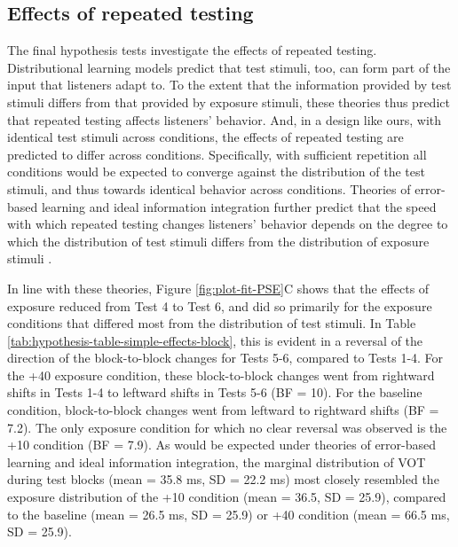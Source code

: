 \documentclass[
  11pt,
  man,mask,floatsintext]{apa6}
\begin{document}
\subsection{Effects of repeated testing}\label{effects-of-repeated-testing}

The final hypothesis tests investigate the effects of repeated testing. Distributional learning models predict that test stimuli, too, can form part of the input that listeners adapt to. To the extent that the information provided by test stimuli differs from that provided by exposure stimuli, these theories thus predict that repeated testing affects listeners' behavior. And, in a design like ours, with identical test stimuli across conditions, the effects of repeated testing are predicted to differ across conditions. Specifically, with sufficient repetition all conditions would be expected to converge against the distribution of the test stimuli, and thus towards identical behavior across conditions. Theories of error-based learning and ideal information integration further predict that the speed with which repeated testing changes listeners' behavior depends on the degree to which the distribution of test stimuli differs from the distribution of exposure stimuli \autocites{davis-sohoglu2020,kleinschmidt-jaeger2015}[for relevant discussion, see also][]{lancia-winter2013,xie-kurumada2024}.

In line with these theories, Figure \ref{fig:plot-fit-PSE}C shows that the effects of exposure reduced from Test 4 to Test 6, and did so primarily for the exposure conditions that differed most from the distribution of test stimuli. In Table \ref{tab:hypothesis-table-simple-effects-block}, this is evident in a reversal of the direction of the block-to-block changes for Tests 5-6, compared to Tests 1-4. For the +40 exposure condition, these block-to-block changes went from rightward shifts in Tests 1-4 to leftward shifts in Tests 5-6 (BF = 10). For the baseline condition, block-to-block changes went from leftward to rightward shifts (BF = 7.2). The only exposure condition for which no clear reversal was observed is the +10 condition (BF = 7.9). As would be expected under theories of error-based learning and ideal information integration, the marginal distribution of VOT during test blocks (mean = 35.8 ms, SD = 22.2 ms) most closely resembled the exposure distribution of the +10 condition (mean = 36.5, SD = 25.9), compared to the baseline (mean = 26.5 ms, SD = 25.9) or +40 condition (mean = 66.5 ms, SD = 25.9).
\end{document}
